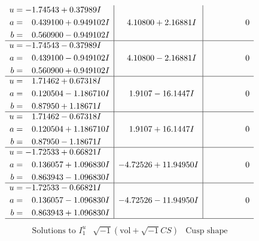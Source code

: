 \documentclass[1p]{elsarticle_modified}
\theoremstyle{definition}
\newcommand{\I}{\sqrt{-1}}
\begin{document}
$$\begin{array}{c|c|c}
\begin{aligned}
u &= -1.74543 + 0.37989 I \\
a &= \phantom{-}0.439100 + 0.949102 I \\
b &= \phantom{-}0.560900 - 0.949102 I\end{aligned}
 & \phantom{-}4.10800 + 2.16881 I & \phantom{-0.000000 } 0 \\ \hline\begin{aligned}
u &= -1.74543 - 0.37989 I \\
a &= \phantom{-}0.439100 - 0.949102 I \\
b &= \phantom{-}0.560900 + 0.949102 I\end{aligned}
 & \phantom{-}4.10800 - 2.16881 I & \phantom{-0.000000 } 0 \\ \hline\begin{aligned}
u &= \phantom{-}1.71462 + 0.67318 I \\
a &= \phantom{-}0.120504 - 1.186710 I \\
b &= \phantom{-}0.87950 + 1.18671 I\end{aligned}
 & \phantom{-}1.9107 - 16.1447 I & \phantom{-0.000000 } 0 \\ \hline\begin{aligned}
u &= \phantom{-}1.71462 - 0.67318 I \\
a &= \phantom{-}0.120504 + 1.186710 I \\
b &= \phantom{-}0.87950 - 1.18671 I\end{aligned}
 & \phantom{-}1.9107 + 16.1447 I & \phantom{-0.000000 } 0 \\ \hline\begin{aligned}
u &= -1.72533 + 0.66821 I \\
a &= \phantom{-}0.136057 + 1.096830 I \\
b &= \phantom{-}0.863943 - 1.096830 I\end{aligned}
 & -4.72526 + 11.94950 I & \phantom{-0.000000 } 0 \\ \hline\begin{aligned}
u &= -1.72533 - 0.66821 I \\
a &= \phantom{-}0.136057 - 1.096830 I \\
b &= \phantom{-}0.863943 + 1.096830 I\end{aligned}
 & -4.72526 - 11.94950 I & \phantom{-0.000000 } 0\\
 \hline 
 \end{array}$$\newpage$$\begin{array}{c|c|c}  
\text{Solutions to }I^u_{1}& \I (\text{vol} + \sqrt{-1}CS) & \text{Cusp shape}\\

\end{array}$$
\end{document}
